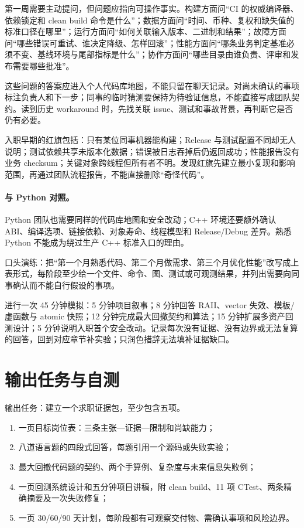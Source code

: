 第一周需要主动提问，但问题应指向可操作事实。构建方面问“CI 的权威编译器、依赖锁定和 clean build 命令是什么”；数据方面问“时间、币种、复权和缺失值的标准口径在哪里”；运行方面问“如何关联输入版本、二进制和结果”；故障方面问“哪些错误可重试、谁决定降级、怎样回滚”；性能方面问“哪条业务判定基准必须不变、基线环境与尾部指标是什么”；协作方面问“哪些目录由谁负责、评审和发布需要哪些批准”。

这些问题的答案应进入个人代码库地图，不能只留在聊天记录。对尚未确认的事项标注负责人和下一步；同事的临时猜测要保持为待验证信息，不能直接写成团队契约。读到历史 workaround 时，先找关联 issue、测试和事故背景，再判断它是否仍有必要。

入职早期的红旗包括：只有某位同事机器能构建；Release 与测试配置不同却无人说明；测试依赖共享未版本化数据；错误被日志吞掉后仍返回成功；性能报告没有业务 checksum；关键对象跨线程但所有者不明。发现红旗先建立最小复现和影响范围，再通过团队流程报告，不能直接删除“奇怪代码”。

\paragraph{与 Python 对照。}
Python 团队也需要同样的代码库地图和安全改动；C++ 环境还要额外确认 ABI、编译选项、链接依赖、对象寿命、线程模型和 Release/Debug 差异。熟悉 Python 不能成为绕过生产 C++ 标准入口的理由。

口头演练：把“第一个月熟悉代码、第二个月做需求、第三个月优化性能”改写成上表形式，每阶段至少给一个文件、命令、图、测试或可观测结果，并列出需要向同事确认而不能自行假设的事项。

\begin{interviewcheck}
进行一次 45 分钟模拟：5 分钟项目叙事；8 分钟回答 RAII、vector 失效、模板/虚函数与 atomic 快照；12 分钟完成最大回撤契约和算法；15 分钟扩展多资产回测设计；5 分钟说明入职首个安全改动。记录每次没有证据、没有边界或无法复算的回答，回到对应章节补实验；只润色措辞无法填补证据缺口。
\end{interviewcheck}

\section{输出任务与自测}

输出任务：建立一个求职证据包，至少包含五项。

\begin{enumerate}
  \item 一页目标岗位表：三条主张—证据—限制和尚缺能力；
  \item 八道语言题的四段式回答，每题引用一个源码或失败实验；
  \item 最大回撤代码题的契约、两个手算例、复杂度与未来信息失败例；
  \item 一页回测系统设计和五分钟项目讲稿，附 clean build、11 项 CTest、两条精确摘要及一次失败修复；
  \item 一页 30/60/90 天计划，每阶段都有可观察交付物、需确认事项和风险边界。
\end{enumerate}

